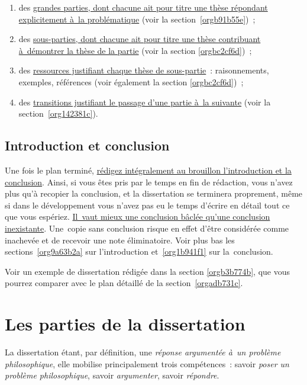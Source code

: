 \documentclass[a4paper,12pt]{report}
\begin{document}
\begin{enumerate}
\item des \uline{grandes parties, dont chacune ait pour titre une thèse répondant
explicitement à la problématique} (voir la section \ref{orgb91b55e}) ;

\item des \uline{sous-parties, dont chacune ait pour titre une thèse contribuant
à démontrer la thèse de la partie} (voir la section \ref{orgbc2cf6d}) ;

\item des \uline{ressources justifiant chaque thèse de sous-partie} :
raisonnements, exemples, références (voir également la section
\ref{orgbc2cf6d}) ;

\item des \uline{transitions justifiant le passage d'une partie à la suivante}
(voir la section \ref{org142381c}).
\end{enumerate}


\chapter{Introduction et conclusion}
\label{sec:org6d11947}

Une fois le plan terminé, \uline{rédigez intégralement au brouillon
l'introduction et la conclusion}​. Ainsi, si vous êtes pris par le temps
en fin de rédaction, vous n'avez plus qu'à recopier la conclusion, et la
dissertation se terminera proprement, même si dans le développement vous
n'avez pas eu le temps d'écrire en détail tout ce que vous espériez.
\uline{Il vaut mieux une conclusion bâclée qu'une conclusion inexistante}.
Une copie sans conclusion risque en effet d'être considérée comme
inachevée et de recevoir une note éliminatoire. Voir plus bas les
sections \ref{org9a63b2a} sur l'introduction et \ref{org1b941f1} sur
la conclusion.

Voir un exemple de dissertation rédigée dans la section \ref{orgb3b774b}, que
vous pourrez comparer avec le plan détaillé de la section \ref{orgadb731c}.

\part{Les parties de la dissertation}
\label{sec:orgaeb36f7}

La dissertation étant, par définition, une \emph{réponse argumentée à un
problème philosophique}, elle mobilise principalement trois
compétences : savoir \emph{poser un problème philosophique}, savoir
\emph{argumenter}, savoir \emph{répondre}.
\end{document}

